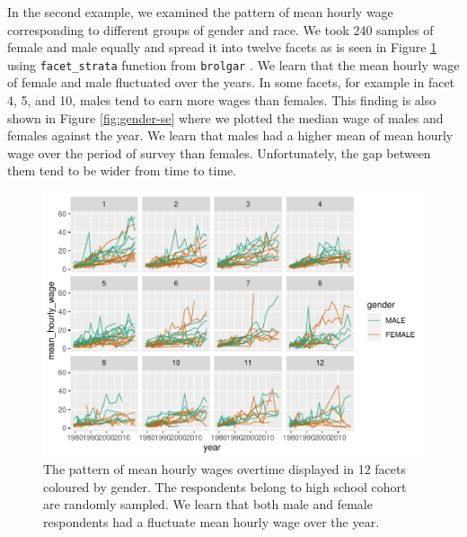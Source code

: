 In the second example, we examined the pattern of mean hourly wage
corresponding to different groups of gender and race. We took 240
samples of female and male equally and spread it into twelve facets as
is seen in Figure \ref{fig:gender-plot} using \texttt{facet\_strata}
function from \texttt{brolgar} \citep{brolgar}. We learn that the mean
hourly wage of female and male fluctuated over the years. In some
facets, for example in facet 4, 5, and 10, males tend to earn more wages
than females. This finding is also shown in Figure \ref{fig:gender-se}
where we plotted the median wage of males and females against the year.
We learn that males had a higher mean of mean hourly wage over the
period of survey than females. Unfortunately, the gap between them tend
to be wider from time to time.

\begin{Schunk}
\begin{figure}
\includegraphics{figures/gender-plot-1} \caption[The pattern of mean hourly wages overtime displayed in 12 facets coloured by gender]{The pattern of mean hourly wages overtime displayed in 12 facets coloured by gender. The respondents belong to high school cohort are randomly sampled. We learn that both male and female respondents had a fluctuate mean hourly wage over the year.}\label{fig:gender-plot}
\end{figure}
\end{Schunk}

